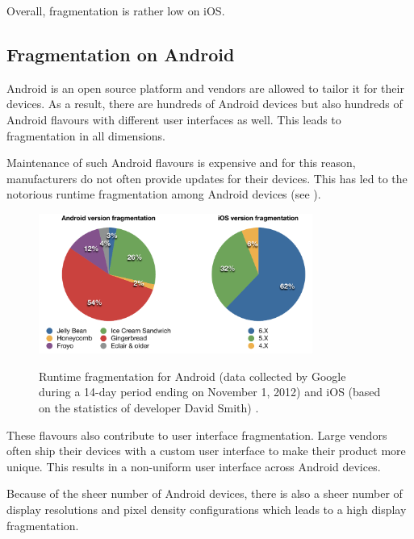 
Overall, fragmentation is rather low on iOS.

\subsection{Fragmentation on Android}

Android is an open source platform and vendors are allowed to tailor it for their devices. As a result, there are hundreds of Android devices but also hundreds of Android flavours with different user interfaces as well. This leads to fragmentation in all dimensions.

Maintenance of such Android flavours is expensive and for this reason, manufacturers do not often provide updates for their devices. This has led to the notorious runtime fragmentation among Android devices (see ). 

\begin{figure}[h!]
    \begin{center}
        \label{fig:runtime_fragmentation}
        \includegraphics[width=0.8\textwidth]{figs/os_distribution.pdf}
        \caption{
            Runtime fragmentation for Android (data collected by Google during a 14-day period ending on November 1, 2012) \citep{android_distribution} and iOS (based on the statistics of developer David Smith) \citep{ios_distribution}.
        }
    \end{center}
\end{figure}

These flavours also contribute to user interface fragmentation. Large vendors often ship their devices with a custom user interface to make their product more unique. This results in a non-uniform user interface across Android devices.

Because of the sheer number of Android devices, there is also a sheer number of display resolutions and pixel density configurations which leads to a high display fragmentation. 

